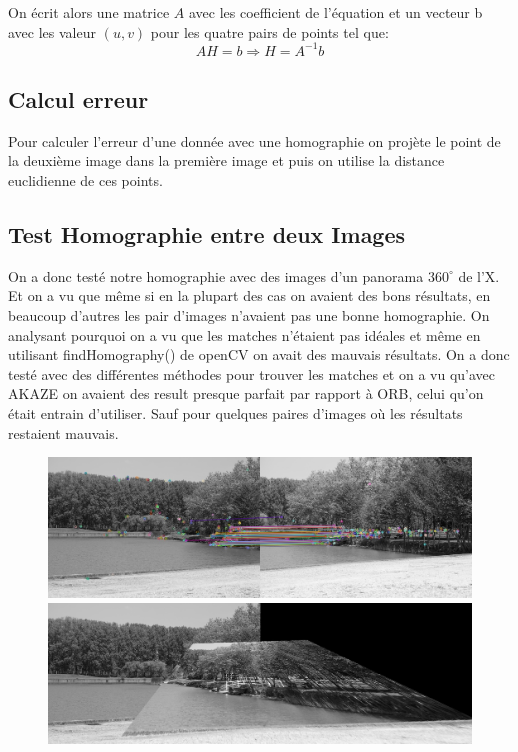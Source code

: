\documentclass[11pt]{article}
\begin{document}
On écrit alors une matrice $A$ avec les coefficient de l'équation et un vecteur b avec les valeur $(u,v)$ pour les quatre pairs de points tel que:
\begin{equation*}
	AH = b \Rightarrow H = A^{-1}b
\end{equation*}

\subsection{Calcul erreur}

Pour calculer l’erreur d’une donnée avec une homographie on projète le point de la deuxième image dans la première image et puis on utilise la distance euclidienne de ces points. 

\subsection{Test Homographie entre deux Images}

On a donc testé notre homographie avec des images d’un panorama $360^{\circ}$ de l’X. Et on a vu que même si en la plupart des cas on avaient des bons résultats, en beaucoup d’autres les pair d’images n’avaient pas une bonne homographie. On analysant pourquoi on a vu que les matches n’étaient pas idéales et même en utilisant findHomography() de openCV on avait des mauvais résultats. On a donc testé avec des différentes méthodes pour trouver les matches et on a vu qu’avec AKAZE on avaient des result presque parfait par rapport à ORB, celui qu'on était entrain d'utiliser. Sauf pour quelques paires d’images où les résultats restaient mauvais. \\

\begin{figure}[H]
\centering
\includegraphics[width=.8\textwidth]{../resources/matchers/orb.jpg}
\includegraphics[width=.8\textwidth]{../resources/matchers/orb_pano.jpg}
\end{figure}
\end{document}
